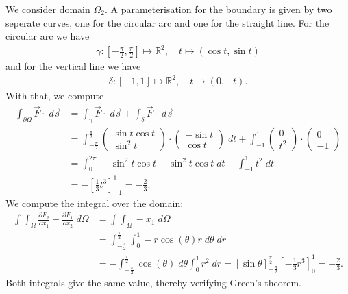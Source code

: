 \documentclass[11pt]{article}
\begin{document}
\begin{solution}
    We consider domain $\Omega_{2}$. 
    A parameterisation for the boundary is given by two seperate curves, one for the circular arc and one for the straight line.
    For the circular arc we have 
    \begin{align}
        \gamma: \left[-\frac{\pi}{2},\frac{\pi}{2}\right] \mapsto \mathbb{R}^2, \quad t \mapsto  (\cos t, \sin t)
    \end{align}
    and for the vertical line we have
    \begin{align}
        \delta: \left[-1,1\right] \mapsto \mathbb{R}^2, \quad t \mapsto (0,-t).
    \end{align}
    With that, we compute 
    \begin{align*}
        \int_{\partial \Omega} \vec{F} \cdot \;d\vec{s} 
        &= 
        \int_{\gamma} \vec{F} \cdot \;d\vec{s} 
        +
        \int_{\delta} \vec{F} \cdot \;d\vec{s} 
        \\&
        = 
        \int_{-\frac{\pi}{2}}^{\frac{\pi}{2}} 
        \begin{pmatrix}\sin t \cos t\\ \sin^2 t \end{pmatrix} 
        \cdot 
        \begin{pmatrix}-\sin t \\ \cos t \end{pmatrix} \; d t 
        + 
        \int_{-1}^1 
        \begin{pmatrix} 0 \\ t^2 \end{pmatrix}
        \cdot 
        \begin{pmatrix} 0 \\ -1 \end{pmatrix}
        \\&
        = 
        \int_0^{2\pi} -\sin^2 t\cos t + \sin^ 2 t \cos t \;dt 
        - 
        \int_{-1}^{1} t^2 \;d t
        \\&
        = 
        - \left[\frac{1}{3} t^3 \right]_{-1}^{1}
        = 
        -\frac{2}{3}
        .
    \end{align*}
    We compute the integral over the domain: 
    \begin{align*}
        \int \int_{\Omega} \frac{\partial F_{2}}{\partial x_{1}} - \frac{\partial F_{1}}{\partial x_{2}} \;d \Omega 
        &
        = 
        \int \int_{\Omega} -x_{1} \; d\Omega
        \\&
        = 
        \int_{-\frac{\pi}{2}}^ {\frac{\pi}{2}} \int_0^1 -r \cos(\theta) r \;d\theta\;dr
        \\&
        = 
        -\int_{-\frac{\pi}{2}}^ {\frac{\pi}{2}} \cos(\theta) \;d \theta \int_0^1 r^ 2 \;d r
        = 
        \left[\sin \theta\right]_{-\frac{\pi}{2}}^ {\frac{\pi}{2}} \left[-\frac{1}{3}r^ 3\right]_0^{1} = -\frac{2}{3}
        .
    \end{align*}
    Both integrals give the same value, thereby verifying Green's theorem.
\end{solution}
\end{document}
